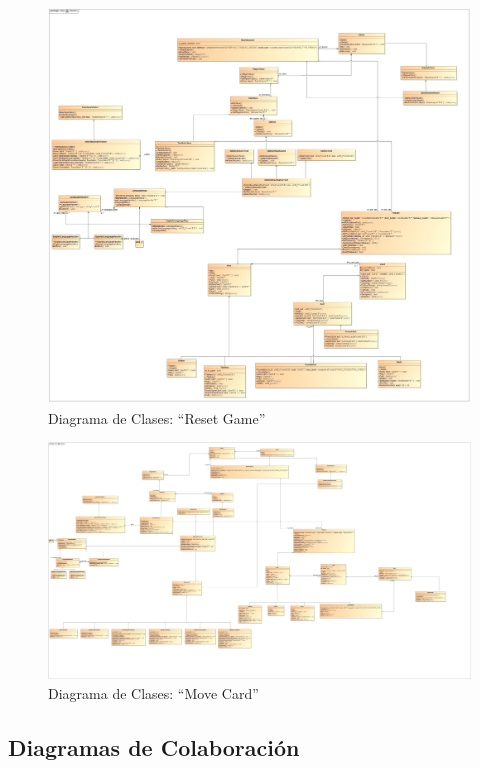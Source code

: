 \documentclass[11pt]{article}
\begin{document}
\begin{landscape}
\begin{center}
 \begin{figure}[H]
 \begin{center}
 \includegraphics[scale=0.22]{Analysis/ResetGame00.jpg}
   \caption{Diagrama de Clases: ``Reset Game''}
   \label{fig:resetgame}
 \end{center}
 \end{figure}
\end{center}
\end{landscape}
\restoregeometry

\begin{landscape}
\begin{center}
 \begin{figure}[H]
 \begin{center}
 \includegraphics[scale=0.18]{Analysis/MoveCard00.jpg}
   \caption{Diagrama de Clases: ``Move Card''}
   \label{fig:movecard}
 \end{center}
 \end{figure}
\end{center}
\end{landscape}
\restoregeometry

\subsection{Diagramas de Colaboración} 
\end{document}
